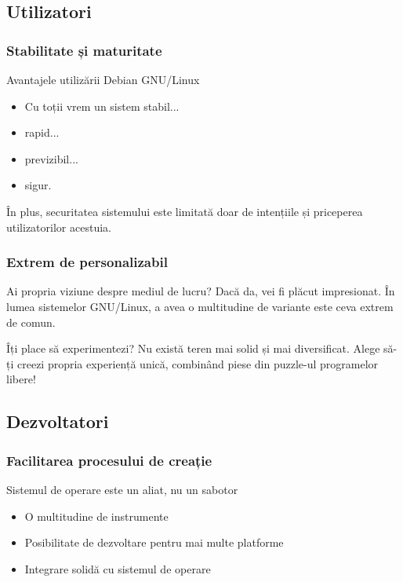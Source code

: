 \documentclass[xcolor=dvipsnames]{beamer}
\begin{document}
\subsection{Utilizatori}
\begin{frame}
\frametitle{Stabilitate și maturitate}
\begin{block}
{Avantajele utilizării Debian GNU/Linux}
\begin{itemize}
	\item Cu toții vrem un sistem stabil...
	\item rapid...
	\item previzibil...
	\item sigur.
\end{itemize}
În plus, securitatea sistemului este limitată doar de intențiile și priceperea utilizatorilor acestuia.
\end{block}
\end{frame}

\begin{frame}
\frametitle{Extrem de personalizabil}
\begin{block}
{Ai propria viziune despre mediul de lucru?}
Dacă da, vei fi plăcut impresionat. În lumea sistemelor GNU/Linux, a avea o multitudine de variante este ceva extrem de comun.
\end{block}
\begin{block}
{Îți place să experimentezi?}
Nu există teren mai solid și mai diversificat. Alege să-ți creezi propria experiență unică, combinând piese din puzzle-ul programelor libere!
\end{block}
\end{frame}

\subsection{Dezvoltatori}
\begin{frame}
\frametitle{Facilitarea procesului de creație}
\begin{block}
{Sistemul de operare este un aliat, nu un sabotor}
\begin{itemize}
	\item O multitudine de instrumente
	\item Posibilitate de dezvoltare pentru mai multe platforme
	\item Integrare solidă cu sistemul de operare
\end{itemize}
\end{block}
\end{frame}
\end{document}
